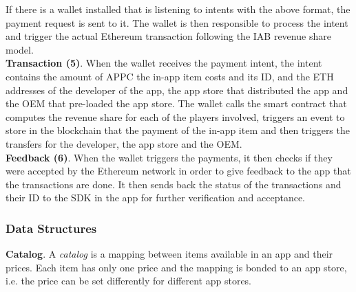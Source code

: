 If there is a wallet installed that is listening to intents with the above format, the payment request is sent to it. The wallet is then responsible to process the intent and trigger the actual Ethereum transaction following the IAB revenue share model. \\

\noindent \textbf{Transaction (5)}. When the wallet receives the payment intent, the intent contains the amount of APPC the in-app item costs and its ID, and the ETH addresses of the developer of the app, the app store that distributed the app and the OEM that pre-loaded the app store. The wallet calls the smart contract that computes the revenue share for each of the players involved, triggers an event to store in the blockchain that the payment of the in-app item and then triggers the transfers for the developer, the app store and the OEM. \\

\noindent \textbf{Feedback (6)}. When the wallet triggers the payments, it then checks if they were accepted by the Ethereum network in order to give feedback to the app that the transactions are done. It then sends back the status of the transactions and their ID to the SDK in the app for further verification and acceptance.

\subsubsection{Data Structures}

\noindent \textbf{Catalog}. A \textit{catalog} is a mapping between items available in an app and their prices. Each item has only one price and the mapping is bonded to an app store, i.e. the price can be set differently for different app stores. \\

